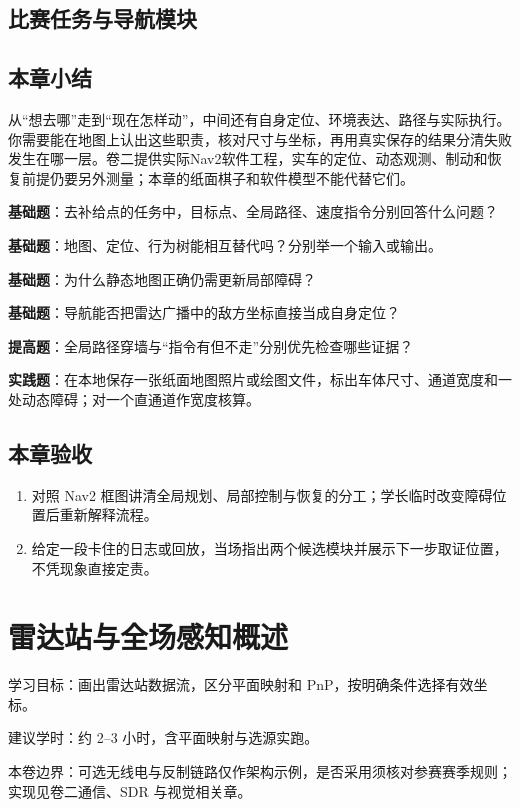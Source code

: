 \documentclass[
  lang=cn,
  scheme=chinese,
  chinesefont=ctexfont,
  11pt,
  oneside,
  device=normal,
  color=cyan,
  mode=fancy
]{elegantbook}
\begin{document}
\section{比赛任务与导航模块}


\section{本章小结}
\begin{conclusion}
从“想去哪”走到“现在怎样动”，中间还有自身定位、环境表达、路径与实际执行。你需要能在地图上认出这些职责，核对尺寸与坐标，再用真实保存的结果分清失败发生在哪一层。卷二提供实际Nav2软件工程，实车的定位、动态观测、制动和恢复前提仍要另外测量；本章的纸面棋子和软件模型不能代替它们。
\end{conclusion}

\begin{problemset}
\item \label{v3-prob-nav-1}\textbf{基础题}：去补给点的任务中，目标点、全局路径、速度指令分别回答什么问题？
\item \label{v3-prob-nav-2}\textbf{基础题}：地图、定位、行为树能相互替代吗？分别举一个输入或输出。
\item \label{v3-prob-nav-3}\textbf{基础题}：为什么静态地图正确仍需更新局部障碍？
\item \label{v3-prob-nav-4}\textbf{基础题}：导航能否把雷达广播中的敌方坐标直接当成自身定位？
\item \label{v3-prob-nav-5}\textbf{提高题}：全局路径穿墙与“指令有但不走”分别优先检查哪些证据？
\item \label{v3-prob-nav-6}\textbf{实践题}：在本地保存一张纸面地图照片或绘图文件，标出车体尺寸、通道宽度和一处动态障碍；对一个直通道作宽度核算。
\end{problemset}

\section{本章验收}
\begin{enumerate}
  \item 对照 Nav2 框图讲清全局规划、局部控制与恢复的分工；学长临时改变障碍位置后重新解释流程。
  \item 给定一段卡住的日志或回放，当场指出两个候选模块并展示下一步取证位置，不凭现象直接定责。
\end{enumerate}

\chapter{雷达站与全场感知概述}
\begin{introduction}
  \item 学习目标：画出雷达站数据流，区分平面映射和 PnP，按明确条件选择有效坐标。
  \item 建议学时：约 2--3 小时，含平面映射与选源实跑。
  \item 本卷边界：可选无线电与反制链路仅作架构示例，是否采用须核对参赛赛季规则；实现见卷二通信、SDR 与视觉相关章。
\end{introduction}
\label{ch:v3-radar}
\end{document}
